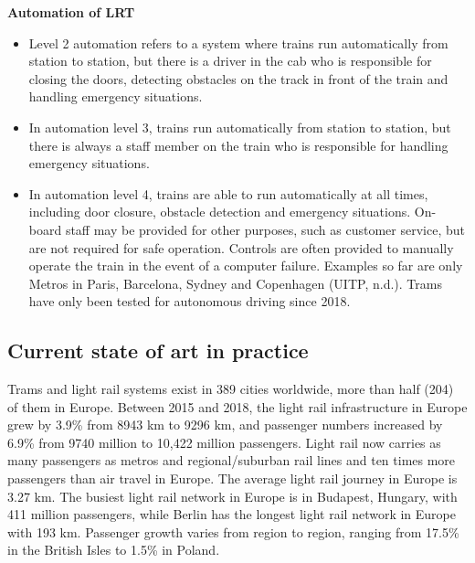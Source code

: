 \documentclass[
]{book}
\providecommand{\tightlist}{%
  \setlength{\itemsep}{0pt}\setlength{\parskip}{0pt}}
\begin{document}
\textbf{Automation of LRT}

\begin{itemize}
\tightlist
\item
  Level 2 automation refers to a system where trains run automatically from station to station, but there is a driver in the cab who is responsible for closing the doors, detecting obstacles on the track in front of the train and handling emergency situations.
\item
  In automation level 3, trains run automatically from station to station, but there is always a staff member on the train who is responsible for handling emergency situations.
\item
  In automation level 4, trains are able to run automatically at all times, including door closure, obstacle detection and emergency situations. On-board staff may be provided for other purposes, such as customer service, but are not required for safe operation. Controls are often provided to manually operate the train in the event of a computer failure. Examples so far are only Metros in Paris, Barcelona, Sydney and Copenhagen (UITP, n.d.). Trams have only been tested for autonomous driving since 2018.
\end{itemize}

\hypertarget{current-state-of-art-in-practice-38}{%
\subsection*{Current state of art in practice}\label{current-state-of-art-in-practice-38}}

Trams and light rail systems exist in 389 cities worldwide, more than half (204) of them in Europe. Between 2015 and 2018, the light rail infrastructure in Europe grew by 3.9\% from 8943 km to 9296 km, and passenger numbers increased by 6.9\% from 9740 million to 10,422 million passengers. Light rail now carries as many passengers as metros and regional/suburban rail lines and ten times more passengers than air travel in Europe.
The average light rail journey in Europe is 3.27 km. The busiest light rail network in Europe is in Budapest, Hungary, with 411 million passengers, while Berlin has the longest light rail network in Europe with 193 km. Passenger growth varies from region to region, ranging from 17.5\% in the British Isles to 1.5\% in Poland.
\end{document}
